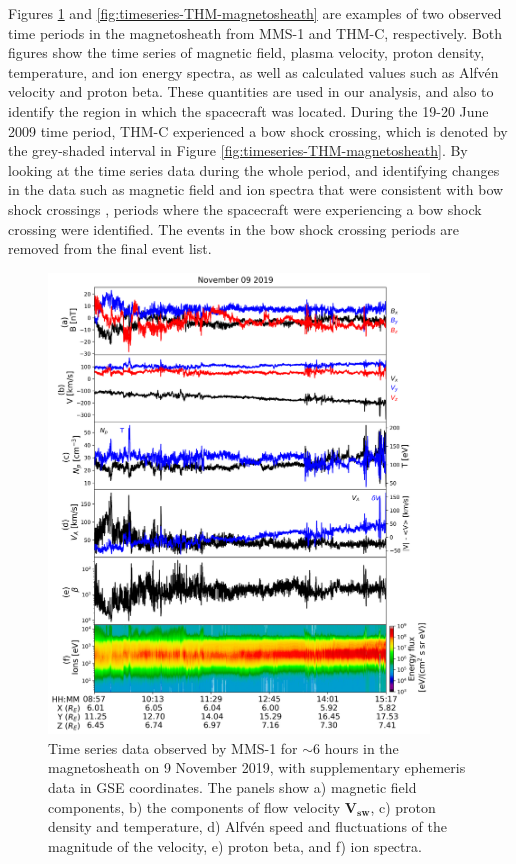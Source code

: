 Figures \ref{fig:timeseries-MMS-magnetosheath} and \ref{fig:timeseries-THM-magnetosheath} are examples of two observed time periods in the magnetosheath from MMS-1 and THM-C, respectively. Both figures show the time series of magnetic field, plasma velocity, proton density, temperature, and ion energy spectra, as well as calculated values such as Alfv\'en velocity and proton beta. These quantities are used in our analysis, and also to identify the region in which the spacecraft was located. During the 19-20 June 2009 time period, THM-C experienced a bow shock crossing, which is denoted by the grey-shaded interval in Figure \ref{fig:timeseries-THM-magnetosheath}. By looking at the time series data during the whole period, and identifying changes in the data such as magnetic field and ion spectra that were consistent with bow shock crossings \citep{Lalti:2022,Trotta:2022}, periods where the spacecraft were experiencing a bow shock crossing were identified. The events in the bow shock crossing periods are removed from the final event list.

\begin{figure}
    \centering
    \includegraphics[width=0.9\textwidth]{Figures/Time series/timeseries_09112019_MMS1.png}
    \caption[Time series data observed in the magnetosheath on 9 November 2019]{Time series data observed by MMS-1 for $\sim$6 hours in the magnetosheath on 9 November 2019, with supplementary ephemeris data in GSE coordinates. The panels show a) magnetic field components, b) the components of flow velocity $\mathbf{V_{sw}}$, c) proton density and temperature, d) Alfv\'en speed and fluctuations of the magnitude of the velocity, e) proton beta, and f) ion spectra.}
    \label{fig:timeseries-MMS-magnetosheath}
\end{figure}

